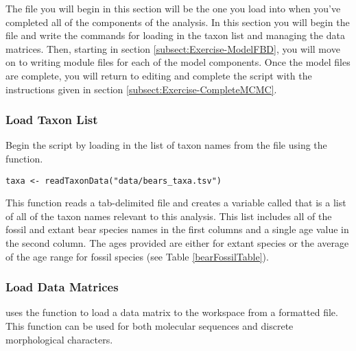 The file you will begin in this section will be the one you load into \RevBayes when you've completed all of the components of the analysis.
In this section you will begin the file and write the \Rev commands for loading in the taxon list and managing the data matrices.
Then, starting in section \ref{subsect:Exercise-ModelFBD}, you will move on to writing module files for each of the model components. 
Once the model files are complete, you will return to editing  and complete the \Rev script with the instructions given in section \ref{subsect:Exercise-CompleteMCMC}.


\medskip
\subsubsection{Load Taxon List}\label{subsub:Exercise-TaxList}

Begin the \Rev script by loading in the list of taxon names from the  file using the  function.
\begin{snugshade*}
\begin{lstlisting}
taxa <- readTaxonData("data/bears_taxa.tsv")
\end{lstlisting}
\end{snugshade*}
This function reads a tab-delimited file and creates a variable called  that is a list of all of the taxon names relevant to this analysis. 
This list includes all of the fossil and extant bear species names in the first columns and a single age value in the second column.
The ages provided are either  for extant species or the average of the age range for fossil species (see Table \ref{bearFossilTable}).



\medskip
\subsubsection{Load Data Matrices}\label{subsub:Exercise-LoadData}

\RevBayes uses the function  to load a data matrix to the workspace from a formatted file. 
This function can be used for both molecular sequences and discrete morphological characters.

